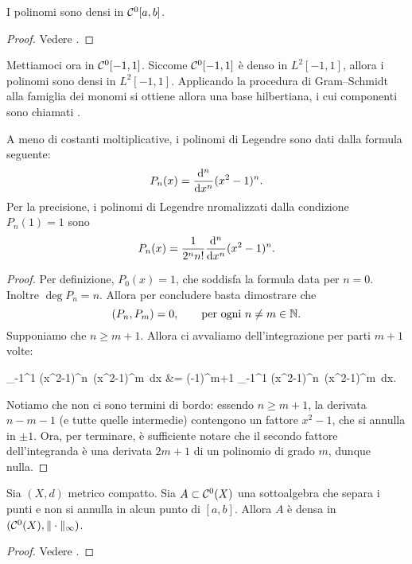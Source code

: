 \begin{theorem}[Weierstrass]
	I polinomi sono densi in $\mathcal{C}^0[a,b]$.
\end{theorem}
\begin{proof}
	Vedere \cite{rudin1991functional}.
\end{proof}

Mettiamoci ora in $\mathcal{C}^0[-1,1]$. Siccome $\mathcal{C}^0[-1,1]$ è denso in $L^2[-1,1]$, allora i polinomi sono densi in $L^2[-1,1]$. Applicando la procedura di Gram--Schmidt alla famiglia dei monomi si ottiene allora una base hilbertiana, i cui componenti sono chiamati .

\begin{theorem}
	A meno di costanti moltiplicative, i polinomi di Legendre sono dati dalla formula seguente:
	\begin{equation*}
		P_n(x) = \frac{\mathrm{d}{^n}}{\mathrm{d}{x^n}} (x^2-1)^n.
	\end{equation*}
	Per la precisione, i polinomi di Legendre nromalizzati dalla condizione $P_n(1) =1$ sono
	\begin{equation*}
		P_n(x) = \frac1{2^n n!} \frac{\mathrm{d}{^n}}{\mathrm{d}{x^n}} (x^2-1)^n.
	\end{equation*}
\end{theorem}
\begin{proof}
	Per definizione, $P_0(x) = 1$, che soddisfa la formula data per $n=0$. Inoltre $\deg P_n = n$.
	Allora per concludere basta dimostrare che
	\begin{equation*}
		(P_n, P_m) = 0, \qquad \text{per ogni $n \neq m \in \mathbb{N}$}.
	\end{equation*}
	Supponiamo che $n \geq m+1$. Allora ci avvaliamo dell'integrazione per parti $m+1$ volte:
	\begin{eqalign*}
		\int_{-1}^1  (x^2-1)^n\,  (x^2-1)^m \,dx &= (-1)^{m+1} \int_{-1}^1  (x^2-1)^n\,  (x^2-1)^m \,dx.
	\end{eqalign*}
	Notiamo che non ci sono termini di bordo: essendo $n \geq m+1$, la derivata $n-m-1$ (e tutte quelle intermedie) contengono un fattore $x^2-1$, che si annulla in $\pm 1$.
	Ora, per terminare, è sufficiente notare che il secondo fattore dell'integranda è una derivata $2m+1$ di un polinomio di grado $m$, dunque nulla.
\end{proof}

\begin{theorem}
	Sia $(X,d)$ metrico compatto. Sia $A \subset \mathcal{C}^0(X)$ una sottoalgebra che separa i punti e non si annulla in alcun punto di $[a,b]$.
	Allora $A$ è densa in $(\mathcal{C}^0(X), \|\cdot\|_\infty)$.
\end{theorem}
\begin{proof}
	Vedere \cite{rudin1991functional}.
\end{proof}

